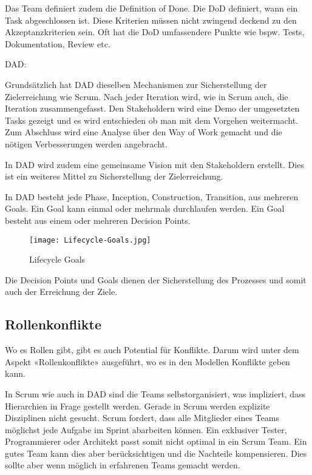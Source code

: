 Das Team definiert zudem die Definition of Done. Die DoD definiert, wann ein Task abgeschlossen ist. Diese Kriterien müssen nicht zwingend deckend zu den Akzeptanzkriterien sein. Oft hat die DoD umfassendere Punkte wie bspw. Tests, Dokumentation, Review etc.

\medskip
{\Large DAD:} \medskip

Grundsätzlich hat DAD dieselben Mechanismen zur Sicherstellung der Zielerreichung wie Scrum. Nach jeder Iteration wird, wie in Scrum auch, die Iteration zusammengefasst. Den Stakeholdern wird eine Demo der umgesetzten Tasks gezeigt und es wird entschieden ob man mit dem Vorgehen weitermacht. Zum Abschluss wird eine Analyse über den Way of Work gemacht und die nötigen Verbesserungen werden angebracht.

In DAD wird zudem eine gemeinsame Vision mit den Stakeholdern erstellt. Dies ist ein weiteres Mittel zu Sicherstellung der Zielerreichung.

In DAD besteht jede Phase, Inception, Construction, Transition, aus mehreren Goals. Ein Goal kann einmal oder mehrmals durchlaufen werden. Ein Goal besteht aus einem oder mehreren Decision Points.

\begin{figure}[H]
	\centering
	\texttt{[image: Lifecycle-Goals.jpg]}
	\caption{Lifecycle Goals}
	\label{fig:goals}
\end{figure}

Die Decision Points und Goals dienen der Sicherstellung des Prozesses und somit auch der Erreichung der Ziele.

\subsection{Rollenkonflikte}

Wo es Rollen gibt, gibt es auch Potential für Konflikte. Darum wird unter dem Aspekt «Rollenkonflikte» ausgeführt, wo es in den Modellen Konflikte geben kann.

In Scrum wie auch in DAD sind die Teams selbstorganisiert, was impliziert, dass Hierarchien in Frage gestellt werden. Gerade in Scrum werden explizite Disziplinen nicht gesucht. Scrum fordert, dass alle Mitglieder eines Teams möglichst jede Aufgabe im Sprint abarbeiten können. Ein exklusiver Tester, Programmierer oder Architekt passt somit nicht optimal in ein Scrum Team. Ein gutes Team kann dies aber berücksichtigen und die Nachteile kompensieren. Dies sollte aber wenn möglich in erfahrenen Teams gemacht werden.

